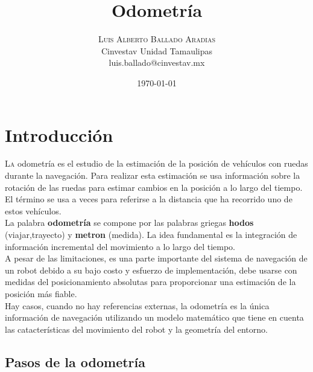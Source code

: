 \documentclass[oneside,onecolumn]{article}
\title{Odometría} %
\author{%
\textsc{Luis Alberto Ballado Aradias} \\%
\normalsize Cinvestav Unidad Tamaulipas \\ %
\normalsize {luis.ballado@cinvestav.mx} %
}
\date{\today} %
\begin{document}
\maketitle


\section{Introducción}

\lettrine[nindent=0em,lines=3]{L}a odometría es el estudio de la estimación de la posición de vehículos con ruedas durante la navegación. Para realizar esta estimación se usa información sobre la rotación de las ruedas para estimar cambios en la posición a lo largo del tiempo. El término se usa a veces para referirse a la distancia que ha recorrido uno de estos vehículos.\\

La palabra \textbf{odometría} se compone por las palabras griegas \textbf{hodos} (viajar,trayecto) y \textbf{metron} (medida). La idea fundamental es la integración de información incremental del movimiento a lo largo del tiempo.\\

A pesar de las limitaciones, es una parte importante del sistema de navegación de un robot debido a su bajo costo y esfuerzo de implementación, debe usarse con medidas del posicionamiento absolutas para proporcionar una estimación de la posición más fiable.\\

Hay casos, cuando no hay referencias externas, la odometría es la única información de navegación utilizando un modelo matemático que tiene en cuenta las catacterísticas del movimiento del robot y la geometría del entorno. %


\subsection{Pasos de la odometría}
\end{document}
